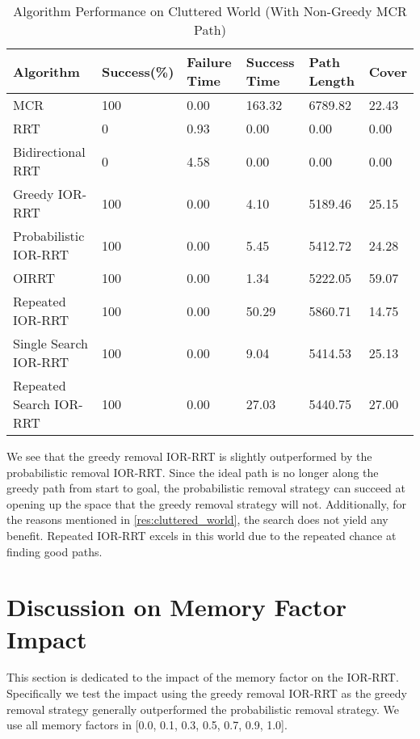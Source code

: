 \begin{table}[h!]
\begin{tabular}{@{}llllll@{}}
\toprule
Algorithm & Success(\%)  & Failure Time  & Success Time  & Path Length & Cover\\ 
\midrule
MCR & 100 & 0.00 & 163.32 & 6789.82 & 22.43 \\
RRT & 0 & 0.93 & 0.00 & 0.00 & 0.00 \\
Bidirectional RRT & 0 & 4.58 & 0.00 & 0.00 & 0.00 \\
Greedy IOR-RRT & 100 & 0.00 & 4.10 & 5189.46 & 25.15 \\
Probabilistic IOR-RRT & 100 & 0.00 & 5.45 & 5412.72 & 24.28 \\
OIRRT & 100 & 0.00 & 1.34 & 5222.05 & 59.07 \\
Repeated IOR-RRT & 100 & 0.00 & 50.29 & 5860.71 & 14.75 \\
Single Search IOR-RRT & 100 & 0.00 & 9.04 & 5414.53 & 25.13 \\
Repeated Search IOR-RRT & 100 & 0.00 & 27.03 & 5440.75 & 27.00 \\
\bottomrule
\end{tabular}
\caption{Algorithm Performance on Cluttered World (With Non-Greedy MCR Path)}
\label{tab:top_light_cluttered_world}
\end{table}

We see that the greedy removal IOR-RRT is slightly outperformed by the probabilistic removal IOR-RRT. Since the ideal path is no longer along the greedy path from start to goal, the probabilistic removal strategy can succeed at opening up the space that the greedy removal strategy will not. Additionally, for the reasons mentioned in \ref{res:cluttered_world}, the search does not yield any benefit. Repeated IOR-RRT excels in this world due to the repeated chance at finding good paths. 

\section{Discussion on Memory Factor Impact}
This section is dedicated to the impact of the memory factor on the IOR-RRT. Specifically we test the impact using the greedy removal IOR-RRT as the greedy removal strategy generally outperformed the probabilistic removal strategy. We use all memory factors in [0.0, 0.1, 0.3, 0.5, 0.7, 0.9, 1.0].

